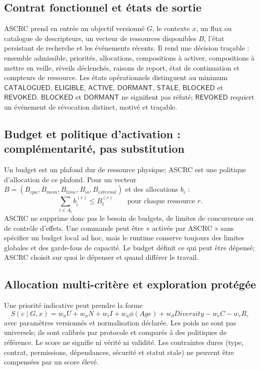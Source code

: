 \subsection{Contrat fonctionnel et états de sortie}
ASCRC prend en entrée un objectif versionné $G$, le contexte $x$, un flux ou catalogue de descripteurs, un vecteur de ressources disponibles $B$, l'état persistant de recherche et les événements récents. Il rend une décision traçable : ensemble admissible, priorités, allocations, compositions à activer, compositions à mettre en veille, réveils déclenchés, raisons de report, état de continuation et compteurs de ressource. Les états opérationnels distinguent au minimum $\mathsf{CATALOGUED}$, $\mathsf{ELIGIBLE}$, $\mathsf{ACTIVE}$, $\mathsf{DORMANT}$, $\mathsf{STALE}$, $\mathsf{BLOCKED}$ et $\mathsf{REVOKED}$. $\mathsf{BLOCKED}$ et $\mathsf{DORMANT}$ ne signifient pas réfuté; $\mathsf{REVOKED}$ requiert un événement de révocation distinct, motivé et traçable.

\subsection{Budget et politique d'activation : complémentarité, pas substitution}
Un budget est un plafond dur de ressource physique; ASCRC est une politique d'allocation de ce plafond. Pour un vecteur $B=(B_{cpu},B_{mem},B_{time},B_{io},B_{external})$ et des allocations $b_i$ :
\[
 \sum_{i\in A_t} b_i^{(r)}\leq B_t^{(r)}\qquad\text{pour chaque ressource }r.
\]
ASCRC ne supprime donc pas le besoin de budgets, de limites de concurrence ou de contrôle d'effets. Une commande peut être « activée par ASCRC » sans spécifier un budget local ad hoc, mais le runtime conserve toujours des limites globales et des garde-fous de capacité. Le budget définit ce qui peut être dépensé; ASCRC choisit sur quoi le dépenser et quand différer le travail.

\subsection{Allocation multi-critère et exploration protégée}
Une priorité indicative peut prendre la forme
\[
 S(c\mid G,x)=w_uU+w_nN+w_iI+w_a\phi(Age)+w_dDiversity-w_cC-w_rR,
\]
avec paramètres versionnés et normalisation déclarée. Les poids ne sont pas universels; ils sont calibrés par protocole et comparés à des politiques de référence. Le score ne signifie ni vérité ni validité. Les contraintes dures (type, contrat, permissions, dépendances, sécurité et statut stale) ne peuvent être compensées par un score élevé.

